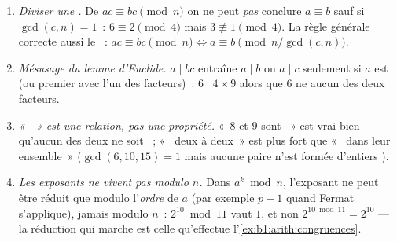\begin{remark}\label{rem:b1:arith:pitfalls}
\begin{enumerate}
  \item \emph{Diviser une .} De $ac \equiv bc \pmod n$
        on ne peut \emph{pas} conclure $a \equiv b$ sauf si $\gcd(c,
        n) = 1$~: $6 \equiv 2 \pmod 4$ mais $3 \not\equiv 1 \pmod
        4$. La règle générale correcte  aussi le ~: $ac
        \equiv bc \pmod n \iff a \equiv b \pmod{n/\gcd(c,n)}$.
  \item \emph{Mésusage du lemme d'Euclide.} $a \mid bc$ entraîne $a
        \mid b$ ou $a \mid c$ seulement si $a$ est \emph{} (ou
        premier avec l'un des facteurs)~: $6 \mid 4 \times 9$ alors que $6$
        ne  aucun des deux facteurs.
  \item \emph{«~~» est une relation, pas une
        propriété.} «~$8$ et $9$ sont ~» est vrai
        bien qu'aucun des deux ne soit ~;
        «~ deux à deux~» est plus fort que
        «~ dans leur ensemble~» ($\gcd(6, 10, 15) = 1$
        mais aucune paire n'est formée d'entiers ).
  \item \emph{Les exposants ne vivent pas modulo $n$.} Dans $a^k \bmod n$,
        l'exposant ne peut être réduit que modulo l'\emph{ordre}
        de $a$ (par exemple $p - 1$ quand Fermat s'applique), jamais
        modulo $n$~: $2^{10} \bmod 11$ vaut $1$, et non $2^{10 \bmod
        11} = 2^{10}$ --- la réduction qui marche est celle qu'effectue
        l'\cref{ex:b1:arith:congruences}.
\end{enumerate}
\end{remark}

